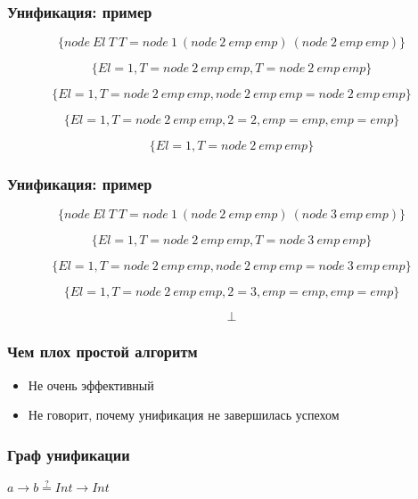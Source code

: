 \documentclass[aspectratio=169]{beamer}
\newcommand{\iseq}{\stackrel{?}{=}}
\begin{document}
\begin{frame}[fragile]
  \frametitle{Унификация: пример}
\[
  \{ node \ El \ T \ T = node \ 1 \ (node \ 2 \ emp \ emp) \ (node \ 2 \ emp \ emp) \}
\]

\[
  \{ El = 1, T = node \ 2 \ emp \ emp, T = node \ 2 \ emp \ emp \}
\]

\[
  \{ El = 1, T = node \ 2 \ emp \ emp, node \ 2 \ emp \ emp = node \ 2 \ emp \ emp \}
\]

\[
  \{ El = 1, T = node \ 2 \ emp \ emp, 2 = 2, emp = emp, emp = emp \}
\]

\[
  \{ El = 1, T = node \ 2 \ emp \ emp \}
\]
\end{frame}


\begin{frame}[fragile]
  \frametitle{Унификация: пример}
\[
  \{ node \ El \ T \ T = node \ 1 \ (node \ 2 \ emp \ emp) \ (node \ 3 \ emp \ emp) \}
\]

\[
  \{ El = 1, T = node \ 2 \ emp \ emp, T = node \ 3 \ emp \ emp \}
\]

\[
  \{ El = 1, T = node \ 2 \ emp \ emp, node \ 2 \ emp \ emp = node \ 3 \ emp \ emp \}
\]

\[
  \{ El = 1, T = node \ 2 \ emp \ emp, 2 = 3, emp = emp, emp = emp \}
\]

\[
  \bot
\]
\end{frame}


\begin{frame}[fragile]
  \frametitle{Чем плох простой алгоритм}
  \begin{itemize}
    \item Не очень эффективный
    \item Не говорит, почему унификация не завершилась успехом
  \end{itemize}
\end{frame}


\begin{frame}[fragile]
  \frametitle{Граф унификации}
\begin{center}
  $a \to b \iseq Int \to Int$
\end{center}

\bigskip

\begin{center}

\end{center}
\end{frame}
\end{document}
